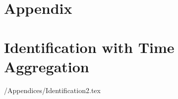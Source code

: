 \documentclass[titlepage]{\econtex}\newcommand{\texname}{IncomeUncertainty}
\begin{document}
\processdelayedfloats

\small

\normalsize

\pagebreak
\appendix

\section*{Appendix}

\section{Identification with Time Aggregation}\label{sec:Identification}


\econtexRoot/Appendices/Identification2.tex
\end{document}
